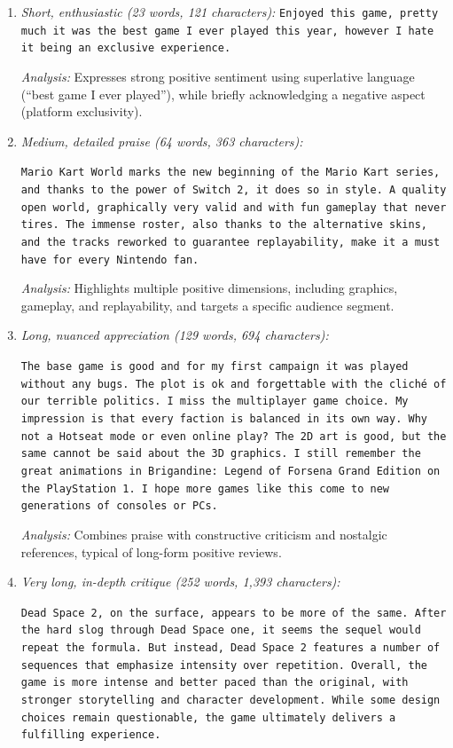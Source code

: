 \begin{enumerate}
    \item \textit{Short, enthusiastic (23 words, 121 characters):}  
    \texttt{Enjoyed this game, pretty much it was the best game I ever played this year, however I hate it being an exclusive experience.}

    \textit{Analysis:} Expresses strong positive sentiment using superlative language (``best game I ever played''), while briefly acknowledging a negative aspect (platform exclusivity).

    \item \textit{Medium, detailed praise (64 words, 363 characters):}

    \texttt{Mario Kart World marks the new beginning of the Mario Kart series, and thanks to the power of Switch 2, it does so in style. A quality open world, graphically very valid and with fun gameplay that never tires. The immense roster, also thanks to the alternative skins, and the tracks reworked to guarantee replayability, make it a must have for every Nintendo fan.}

    \textit{Analysis:} Highlights multiple positive dimensions, including graphics, gameplay, and replayability, and targets a specific audience segment.

    \item \textit{Long, nuanced appreciation (129 words, 694 characters):}

    \texttt{The base game is good and for my first campaign it was played without any bugs. The plot is ok and forgettable with the cliché of our terrible politics. I miss the multiplayer game choice. My impression is that every faction is balanced in its own way. Why not a Hotseat mode or even online play? The 2D art is good, but the same cannot be said about the 3D graphics. I still remember the great animations in Brigandine: Legend of Forsena Grand Edition on the PlayStation 1. I hope more games like this come to new generations of consoles or PCs.}

    \textit{Analysis:} Combines praise with constructive criticism and nostalgic references, typical of long-form positive reviews.

    \item \textit{Very long, in-depth critique (252 words, 1{,}393 characters):}

    \texttt{Dead Space 2, on the surface, appears to be more of the same. After the hard slog through Dead Space one, it seems the sequel would repeat the formula. But instead, Dead Space 2 features a number of sequences that emphasize intensity over repetition. Overall, the game is more intense and better paced than the original, with stronger storytelling and character development. While some design choices remain questionable, the game ultimately delivers a fulfilling experience.}


\end{enumerate}
